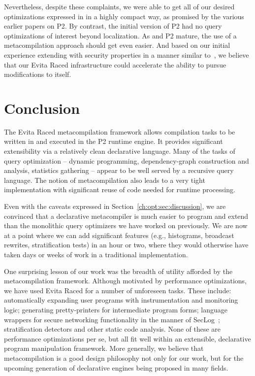 Nevertheless, despite these complaints, we were able to get all of our desired
optimizations expressed in \OVERLOG in a highly compact way, as promised by the
various earlier papers on P2.  By contrast, the initial version of P2 had no
query optimizations of interest beyond localization.  As \OVERLOG and P2
mature, the use of a metacompilation approach should get even easier.  And
based on our initial experience extending \OVERLOG with security properties in
a manner similar to~\cite{abadi-netdb07}, we believe that our Evita Raced
infrastructure could accelerate the ability to pursue modifications to \OVERLOG
itself.

\section{Conclusion} 
\label{ch:opt:sec:summary} 

The Evita Raced metacompilation framework allows \OVERLOG compilation tasks to
be written in \OVERLOG and executed in the P2 runtime engine.  It provides
significant extensibility via a relatively clean declarative language.  Many of
the tasks of query optimization -- dynamic programming, dependency-graph
construction and analysis, statistics gathering -- appear to be well served by
a recursive query language.  The notion of metacompilation also leads to a very
tight implementation with significant reuse of code needed for runtime
processing.

Even with the caveats expressed in Section~\ref{ch:opt:sec:discussion}, we are
convinced that a declarative metacompiler is much easier to program and extend
than the monolithic query optimizers we have worked on previously.  We are now
at a point where we can add significant features (e.g., histograms, broadcast
rewrites, stratification tests) in an hour or two, where they would otherwise
have taken days or weeks of work in a traditional implementation.

One surprising lesson of our work was the breadth of utility afforded by the
metacompilation framework.  Although motivated by performance optimizations, we
have used Evita Raced for a number of unforeseen tasks.  These include:
automatically expanding user programs with instrumentation and monitoring
logic; generating pretty-printers for intermediate program forms; language
wrappers for secure networking functionality in the manner of
SecLog~\cite{abadi-netdb07}; stratification detectors and other static code
analysis.  None of these are performance optimizations per se, but all fit well
within an extensible, declarative program manipulation framework.  More
generally, we believe that metacompilation is a good design philosophy not only
for our work, but for the upcoming generation of declarative engines being
proposed in many fields.

